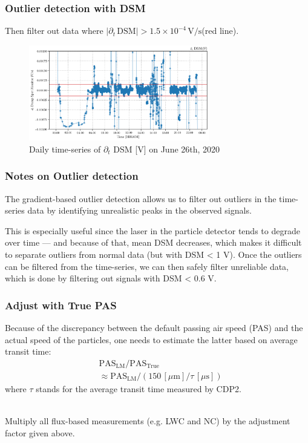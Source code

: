 \documentclass{beamer}
\begin{document}
\begin{frame}
    \frametitle{Outlier detection with DSM}
    Then filter out data where $| \partial_t \, \mathrm{DSM} | > 1.5 \times 10^{-4} \, \mathrm{V/s}$\footnotemark[1] (red line).

    \begin{figure}
        \centering
        \includegraphics[width=0.7\textwidth]{img/dsm_dt.png}
        \caption{Daily time-series of $\partial_t$ DSM [V] on June 26th, 2020}
    \end{figure}

\end{frame}

\begin{frame}
    \frametitle{Notes on Outlier detection}
    The gradient-based outlier detection allows us to filter out outliers in the time-series data by identifying unrealistic peaks in the observed signals.


    This is especially useful since the laser in the particle detector tends to degrade over time --- and because of that, mean DSM decreases, which makes it difficult to separate outliers from normal data (but with DSM < 1 V). Once the outliers can be filtered from the time-series, we can then safely filter unreliable data, which is done by filtering out signals with DSM < 0.6 V.
\end{frame}

\begin{frame}
    \frametitle{Adjust with True PAS}
    Because of the discrepancy between the default passing air speed (PAS) and the actual speed of the particles, one needs to estimate the latter based on average transit time:
    \begin{align*}
         & \mathrm{PAS}_\mathrm{LM} / \mathrm{PAS}_\mathrm{True}                                   \\
         & \approx \mathrm{PAS}_\mathrm{LM} / (150 \, [\mu \mathrm{m}] / \tau \, [\mu \mathrm{s}])
    \end{align*}
    where $\tau$ stands for the average transit time measured by CDP2.\\~\

    Multiply all flux-based measurements (e.g. LWC and NC) by the adjustment factor given above.
\end{frame}
\end{document}
